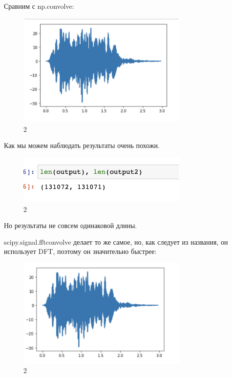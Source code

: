 \documentclass[10pt,a4paper,oneside]{article}
\begin{document}
Сравним с np.convolve:

\begin{figure}[H]
        \centering
        \includegraphics[width=0.75\textwidth]{pics/6.png}
        \caption{2}
        \label{fig:first}
\end{figure}

Как мы можем наблюдать результаты очень похожи.

\begin{figure}[H]
        \centering
        \includegraphics[width=0.75\textwidth]{pics/7.png}
        \caption{2}
        \label{fig:first}
\end{figure}

Но результаты не совсем одинаковой длины.

scipy.signal.fftconvolve делает то же самое, но, как следует из названия, он использует DFT, поэтому он значительно быстрее:

\begin{figure}[H]
        \centering
        \includegraphics[width=0.75\textwidth]{pics/8.png}
        \caption{2}
        \label{fig:first}
\end{figure}
\end{document}
